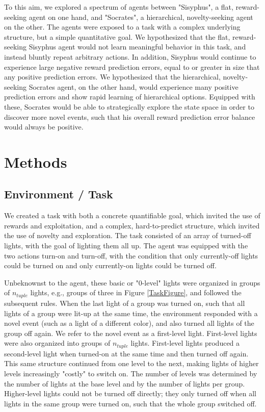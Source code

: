 \documentclass{article}
\begin{document}
To this aim, we explored a spectrum of agents between "Sisyphus", a flat, reward-seeking agent on one hand, and "Socrates", a hierarchical, novelty-seeking agent on the other. The agents were exposed to a task with a complex underlying structure, but a simple quantitative goal. We hypothesized that the flat, reward-seeking Sisyphus agent would not learn meaningful behavior in this task, and instead bluntly repeat arbitrary actions. In addition, Sisyphus would continue to experience large negative reward prediction errors, equal to or greater in size that any positive prediction errors. We hypothesized that the hierarchical, novelty-seeking Socrates agent, on the other hand, would experience many positive prediction errors and show rapid learning of hierarchical options. Equipped with these, Socrates would be able to strategically explore the state space in order to discover more novel events, such that his overall reward prediction error balance would always be positive. 


\section{Methods}

\subsection{Environment / Task}

We created a task with both a concrete quantifiable goal, which invited the use of rewards and exploitation, and a complex, hard-to-predict structure, which invited the use of novelty and exploration. The task consisted of an array of turned-off lights, with the goal of lighting them all up. The agent was equipped with the two actions turn-on and turn-off, with the condition that only currently-off lights could be turned on and only currently-on lights could be turned off.

Unbeknownst to the agent, these basic or "0-level" lights were organized in groups of $n_{tuple}$ lights, e.g., groups of three in Figure \ref{TaskFigure}, and followed the subsequent rules. When the last light of a group was turned on, such that all lights of a group were lit-up at the same time, the environment responded with a novel event (such as a light of a different color), and also turned all lights of the group off again. We refer to the novel event as a first-level light. First-level lights were also organized into groups of $n_{tuple}$ lights. First-level lights produced a second-level light when turned-on at the same time and then turned off again. This same structure continued from one level to the next, making lights of higher levels increasingly "costly" to switch on. The number of levels was determined by the number of lights at the base level and by the number of lights per group. Higher-level lights could not be turned off directly; they only turned off when all lights in the same group were turned on, such that the whole group switched off.
\end{document}
